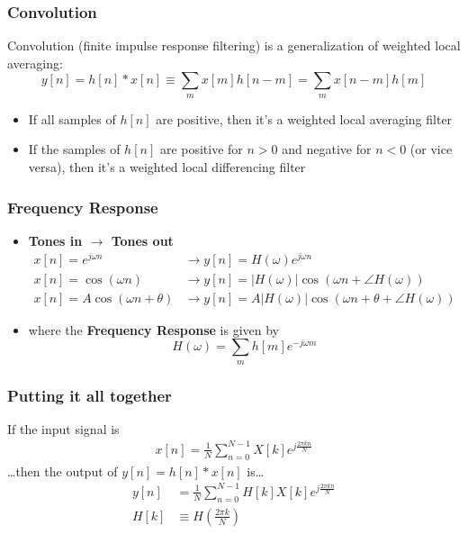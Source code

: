 \documentclass{beamer}
\begin{document}
\begin{frame}
  \frametitle{Convolution}

  Convolution (finite impulse response filtering) is a generalization of weighted local averaging:
  \begin{displaymath}
    y[n] = h[n]\ast x[n] \equiv \sum_m x[m] h[n-m] = \sum_m x[n-m] h[m]
  \end{displaymath}
  \begin{itemize}
  \item If all samples of $h[n]$ are positive, then it's a weighted
    local averaging filter
  \item If the samples of $h[n]$ are positive for $n>0$ and negative
    for $n<0$ (or vice versa), then it's a weighted local differencing
    filter
  \end{itemize}
\end{frame}

\begin{frame}
  \frametitle{Frequency Response}
  \begin{itemize}
  \item {\bf Tones in $\rightarrow$ Tones out}
    \begin{align*}
      x[n]=e^{j\omega n} &\rightarrow y[n]=H(\omega)e^{j\omega n}\\
      x[n]=\cos\left(\omega n\right)
      &\rightarrow y[n]=|H(\omega)|\cos\left(\omega n+\angle H(\omega)\right)\\
      x[n]=A\cos\left(\omega n+\theta\right)
      &\rightarrow y[n]=A|H(\omega)|\cos\left(\omega n+\theta+\angle H(\omega)\right)
    \end{align*}
  \item where the {\bf Frequency Response} is given by
    \[
    H(\omega) = \sum_m h[m]e^{-j\omega m}
    \]
  \end{itemize}
\end{frame}  

\begin{frame}
  \frametitle{Putting it all together}

  If the input signal is
  \begin{align*}
    x[n] = \frac{1}{N}\sum_{n=0}^{N-1} X[k]e^{j\frac{2\pi kn}{N}}
  \end{align*}
  \ldots then the output of $y[n]=h[n]\ast x[n]$ is\ldots
  \begin{align*}
    y[n] &= \frac{1}{N}\sum_{n=0}^{N-1} H[k] X[k]e^{j\frac{2\pi kn}{N}}\\
    H[k] &\equiv H\left(\frac{2\pi k}{N}\right)
  \end{align*}
\end{frame}
\end{document}
